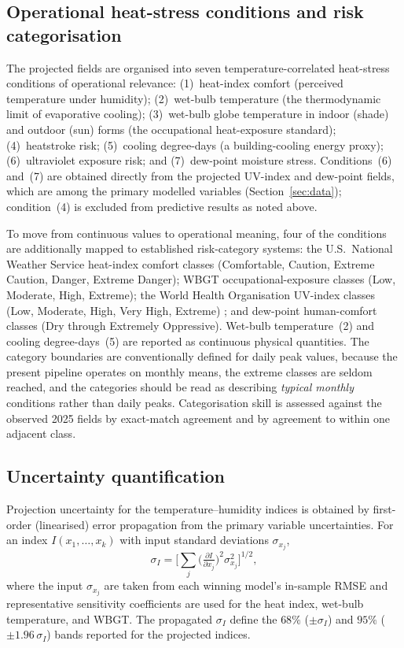 \documentclass[review,11pt]{elsarticle}
\begin{document}
\subsection{Operational heat-stress conditions and risk categorisation}
\label{sec:conditions}
The projected fields are organised into seven temperature-correlated heat-stress
conditions of operational relevance: (1)~heat-index comfort (perceived
temperature under humidity); (2)~wet-bulb temperature (the thermodynamic limit of
evaporative cooling); (3)~wet-bulb globe temperature in indoor (shade) and outdoor
(sun) forms (the occupational heat-exposure standard); (4)~heatstroke risk;
(5)~cooling degree-days (a building-cooling energy proxy); (6)~ultraviolet
exposure risk; and (7)~dew-point moisture stress. Conditions~(6) and~(7) are
obtained directly from the projected UV-index and dew-point fields, which are
among the primary modelled variables (Section~\ref{sec:data}); condition~(4) is
excluded from predictive results as noted above.

To move from continuous values to operational meaning, four of the conditions are
additionally mapped to established risk-category systems: the U.S.\ National
Weather Service heat-index comfort classes (Comfortable, Caution, Extreme
Caution, Danger, Extreme Danger); WBGT occupational-exposure classes (Low,
Moderate, High, Extreme); the World Health Organisation UV-index classes (Low,
Moderate, High, Very High, Extreme) \citep{who2002}; and dew-point human-comfort
classes (Dry through Extremely Oppressive). Wet-bulb temperature~(2) and cooling
degree-days~(5) are reported as continuous physical quantities. The category
boundaries are conventionally defined for daily peak values, because the present
pipeline operates on monthly means, the extreme classes are seldom reached, and
the categories should be read as describing \emph{typical monthly} conditions
rather than daily peaks. Categorisation skill is assessed against the observed
2025 fields by exact-match agreement and by agreement to within one adjacent
class.

\subsection{Uncertainty quantification}\label{sec:uncertainty}
Projection uncertainty for the temperature--humidity indices is obtained by
first-order (linearised) error propagation from the primary variable
uncertainties. For an index $I(x_1,\dots,x_k)$ with input standard deviations
$\sigma_{x_j}$,
\begin{equation}
\sigma_{I}=\Bigg[\sum_{j}\Big(\tfrac{\partial I}{\partial x_j}\Big)^{2}
\sigma_{x_j}^{2}\Bigg]^{1/2},
\label{eq:errprop}
\end{equation}
where the input $\sigma_{x_j}$ are taken from each winning model's in-sample
RMSE and representative sensitivity coefficients are used for the heat index,
wet-bulb temperature, and WBGT. The propagated $\sigma_{I}$ define the
$68\%$ ($\pm\sigma_{I}$) and $95\%$ ($\pm1.96\,\sigma_{I}$) bands reported for
the projected indices.
\end{document}
